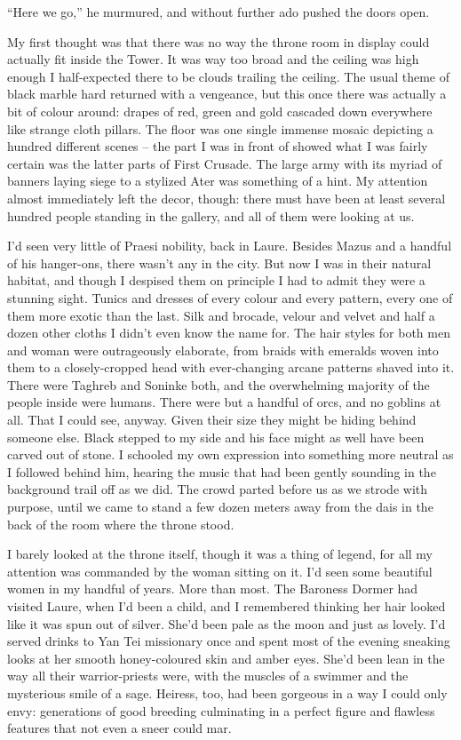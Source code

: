 \documentclass[12pt, openany]{book}
\begin{document}
“Here we go,” he murmured, and without further ado pushed the doors open.

My first thought was that there was no way the throne room in display could actually fit inside the Tower. It was way too broad and the ceiling was high enough I half-expected there to be clouds trailing the ceiling. The usual theme of black marble hard returned with a vengeance, but this once there was actually a bit of colour around: drapes of red, green and gold cascaded down everywhere like strange cloth pillars. The floor was one single immense mosaic depicting a hundred different scenes – the part I was in front of showed what I was fairly certain was the latter parts of First Crusade. The large army with its myriad of banners laying siege to a stylized Ater was something of a hint. My attention almost immediately left the decor, though: there must have been at least several hundred people standing in the gallery, and all of them were looking at us.

I’d seen very little of Praesi nobility, back in Laure. Besides Mazus and a handful of his hanger-ons, there wasn’t any in the city. But now I was in their natural habitat, and though I despised them on principle I had to admit they were a stunning sight. Tunics and dresses of every colour and every pattern, every one of them more exotic than the last. Silk and brocade, velour and velvet and half a dozen other cloths I didn’t even know the name for. The hair styles for both men and woman were outrageously elaborate, from braids with emeralds woven into them to a closely-cropped head with ever-changing arcane patterns shaved into it. There were Taghreb and Soninke both, and the overwhelming majority of the people inside were humans. There were but a handful of orcs, and no goblins at all. That I could see, anyway. Given their size they might be hiding behind someone else. Black stepped to my side and his face might as well have been carved out of stone. I schooled my own expression into something more neutral as I followed behind him, hearing the music that had been gently sounding in the background trail off as we did. The crowd parted before us as we strode with purpose, until we came to stand a few dozen meters away from the dais in the back of the room where the throne stood.

I barely looked at the throne itself, though it was a thing of legend, for all my attention was commanded by the woman sitting on it. I’d seen some beautiful women in my handful of years. More than most. The Baroness Dormer had visited Laure, when I’d been a child, and I remembered thinking her hair looked like it was spun out of silver. She’d been pale as the moon and just as lovely. I’d served drinks to Yan Tei missionary once and spent most of the evening sneaking looks at her smooth honey-coloured skin and amber eyes. She’d been lean in the way all their warrior-priests were, with the muscles of a swimmer and the mysterious smile of a sage. Heiress, too, had been gorgeous in a way I could only envy: generations of good breeding culminating in a perfect figure and flawless features that not even a sneer could mar. 
\end{document}

